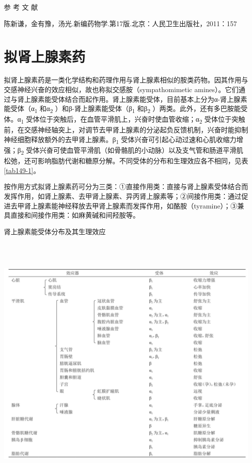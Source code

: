 \protect\hypertarget{text00404.html}{}{}

\hypertarget{text00404.htmlux5cux23CHP17-1-7}{}
参 考 文 献

陈新谦，金有豫，汤光.新编药物学.第17版.北京：人民卫生出版社，2011：157

\protect\hypertarget{text00405.html}{}{}

\chapter{拟肾上腺素药}

拟肾上腺素药是一类化学结构和药理作用与肾上腺素相似的胺类药物。因其作用与交感神经兴奋的效应相似，故也称拟交感胺（sympathomimetic
amines）。它们通过与肾上腺素能受体结合而起作用。肾上腺素能受体，目前基本上分为α-肾上腺素能受体（α\textsubscript{1}
和α\textsubscript{2} ）和β-肾上腺素能受体（β\textsubscript{1}
和β\textsubscript{2} ）两类。此外，还有多巴胺能受体。α\textsubscript{1}
受体位于突触后，在血管平滑肌上，兴奋时使血管收缩；α\textsubscript{2}
受体位于突触前，在交感神经轴突上，对调节去甲肾上腺素的分泌起负反馈机制，兴奋时能抑制神经细胞释放额外的去甲肾上腺素。β\textsubscript{1}
受体兴奋可引起心动过速和心肌收缩力增强；β\textsubscript{2}
受体兴奋可使血管平滑肌（如骨骼肌的小动脉）以及支气管和肠道平滑肌松弛，还可影响脂肪代谢和糖原分解。不同受体的分布和生理效应各不相同，见表\ref{tab149-1}。

按作用方式拟肾上腺素药可分为三类：①直接作用类：直接与肾上腺素受体结合而发挥作用，如肾上腺素、去甲肾上腺素、异丙肾上腺素等；②间接作用类：通过促进去甲肾上腺素能神经释放去甲肾上腺素而发挥作用，如酪胺（tyramine）；③兼具直接和间接作用类：如麻黄碱和间羟胺等。

\begin{table}[htbp]
\centering
\caption{肾上腺素能受体分布及其生理效应}
\label{tab149-1}
\includegraphics[width=6.64583in,height=5.1875in]{./images/Image00551.jpg}
\end{table}

